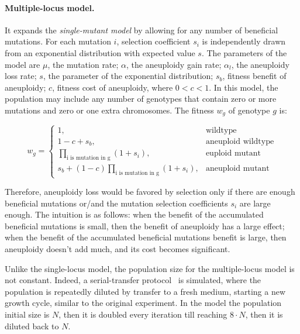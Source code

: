 \documentclass[12pt]{extarticle}
\begin{document}
\paragraph*{Multiple-locus model.} It expands the \emph{single-mutant model} by allowing for any number of beneficial mutations. For each mutation $i$, selection coefficient $s_i$ is independently drawn from an exponential distribution with expected value $s$. The parameters of the model are $\mu$, the mutation rate; $\alpha$, the aneuploidy gain rate; $\alpha_l$, the aneuploidy loss rate; $s$, the parameter of the exponential distribution; $s_b$, fitness benefit of aneuploidy; $c$, fitness cost of aneuploidy, where $0<c<1$. In this model, the population may include any number of genotypes that contain zero or more mutations and zero or one extra chromosomes. The fitness $w_g$ of genotype $g$ is: 

\begin{equation} \label{eq:multiple-fitness}
w_g= 
\begin{cases}
   1, & \text{wildtype} \\
	1-c+s_b, & \text{aneuploid wildtype} \\
	\prod_{\text{i is mutation in g}}{(1+s_i)}, & \text{euploid mutant} \\ 
	s_b+(1-c)\prod_{\text{i is mutation in g}}{(1+s_i)}, & \text{aneuploid mutant}
\end{cases}
\end{equation}

Therefore, aneuploidy loss would be favored by selection only if there are enough beneficial mutations or/and the mutation selection coefficients $s_i$ are large enough. The intuition is as follows: when the benefit of the accumulated beneficial mutations is small, then the benefit of aneuploidy has a large effect; when the benefit of the accumulated beneficial mutations benefit is large, then aneuploidy doesn’t add much, and its cost becomes significant.

Unlike the single-locus model, the population size for the multiple-locus model is not constant. Indeed, a serial-transfer protocol~\citep{Barrick2013} is simulated, where the population is repeatedly diluted by transfer to a fresh medium, starting a new growth cycle, similar to the original experiment. In the model the population initial size is $N$, then it is doubled every iteration till reaching $8\cdot{N}$, then it is diluted back to $N$.
\end{document}
